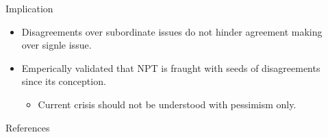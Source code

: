 \documentclass[final]{beamer}
\newlength{\sepwidth}
\newlength{\colwidth}
\newcommand{\separatorcolumn}{\begin{column}{\sepwidth}\end{column}}
\begin{document}
\begin{frame}[t]
\begin{columns}[t]
\begin{column}{\colwidth}
\begin{block}{Implication}
    \begin{itemize}
      \item Disagreements over subordinate issues do not hinder agreement making over signle issue.
      \item Emperically validated that NPT is fraught with seeds of disagreements since its conception.
      \begin{itemize}
        \item Current crisis should not be understood with pessimism only.
      \end{itemize}
    \end{itemize}

  \end{block}

  \begin{block}{References}
    \footnotesize
    \printbibliography[heading=none]
  \end{block}

\end{column}

\separatorcolumn
\end{columns}
\end{frame}
\end{document}
